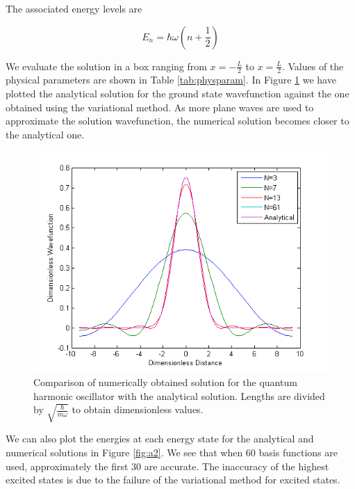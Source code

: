 \documentclass[12pt, a4paper, twocolumn]{article}
\begin{document}
The associated energy levels are 

\begin{equation}
E_n = \hbar \omega (n+\frac{1}{2})
\end{equation}

We evaluate the solution in a box ranging from $x=-\frac{L}{2}$ to $x=\frac{L}{2}$. Values of the physical parameters are shown in Table \ref{tab:physparam}. In Figure \ref{fig:a1} we have plotted the analytical solution for the ground state wavefunction against the one obtained using the variational method. As more plane waves are used to approximate the solution wavefunction, the numerical solution becomes closer to the analytical one. 

\begin{figure}[h!]
  \centering
    \includegraphics[scale=0.5]{a1.png}
	\caption{Comparison of numerically obtained solution for the quantum harmonic oscillator with the analytical solution. Lengths are divided by $\sqrt{\frac{\hbar}{m\omega}}$ to obtain dimensionless values.}
	\label{fig:a1}
\end{figure}

We can also plot the energies at each energy state for the analytical and numerical solutions in Figure \ref{fig:a2}. We see that when 60 basis functions are used, approximately the first 30 are accurate. The inaccuracy of the highest excited states is due to the failure of the variational method for excited states.
\end{document}
